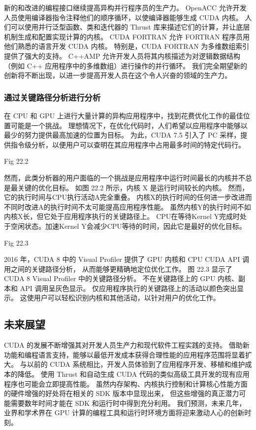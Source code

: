 新的和改进的编程接口继续提高异构并行程序员的生产力。 
OpenACC 允许开发人员使用编译器指令注释他们的顺序循环，以使编译器能够生成 CUDA 内核。 
人们可以使用并行泛型函数、类和迭代器的 Thrust 库来描述它们的计算，并让底层机制生成和配置实现计算的内核。 
CUDA FORTRAN 允许 FORTRAN 程序员用他们熟悉的语言开发 CUDA 内核。 
特别是，CUDA FORTRAN 为多维数组索引提供了强大的支持。 
C++AMP 允许开发人员将其内核描述为对逻辑数据结构（例如 C++ 应用程序中的多维数组）进行操作的并行循环。 
我们完全期望新的创新将不断出现，以进一步提高开发人员在这个令人兴奋的领域的生产力。

\subsubsection{通过关键路径分析进行分析}
在 CPU 和 GPU 上进行大量计算的异构应用程序中，找到花费优化工作的最佳位置可能是一个挑战。 
理想情况下，在优化代码时，人们希望以应用程序中能够以最少的努力提供最高加速的位置为目标。 
为此，CUDA 7.5 引入了 PC 采样，提供指令级分析，以便用户可以查明在其应用程序中占用最多时间的特定代码行。

{\color{red} Fig 22.2}

然而，此类分析器的用户面临的一个挑战是应用程序中运行时间最长的内核并不总是最关键的优化目标。 
如图 22.2 所示，内核 X 是运行时间较长的内核。 然而，它的执行时间与CPU执行活动A完全重叠。
内核X的执行时间的任何进一步改进而不同时改进A的执行时间不太可能提高应用程序性能。 
虽然内核Y的执行时间不如内核X长，但它处于应用程序执行的关键路径上。 
CPU在等待Kernel Y完成时处于空闲状态。加速Kernel Y会减少CPU等待的时间，因此它是最好的优化目标。

{\color{red} Fig 22.3}

2016 年，CUDA 8 中的 Visual Profiler 提供了 GPU 内核和 CPU CUDA API 调用之间的关键路径分析，
从而能够更精确地定位优化工作。 图 22.3 显示了 CUDA 8 Visual Profiler 中的关键路径分析。 
不在关键路径上的 GPU 内核、副本和 API 调用呈灰色显示。 仅应用程序执行的关键路径上的活动以颜色突出显示。 
这使用户可以轻松识别内核和其他活动，以针对用户的优化工作。

\subsection{未来展望}
CUDA 的发展不断增强其对开发人员生产力和现代软件工程实践的支持。 
借助新功能和编程语言支持，能够以最低开发成本获得合理性能的应用程序范围将显着扩大。 
与以前的 CUDA 系统相比，开发人员体验到了应用程序开发、移植和维护成本的降低。 
使用 Thrust 和自动生成 CUDA 代码的类似高级工具开发的现有应用程序也可能会立即提高性能。 
虽然内存架构、内核执行控制和计算核心性能方面的硬件增强的好处将在相关的 SDK 版本中显现出来，
但这些增强的真正潜力可能需要数年时间才能在 SDK 和运行时中得到充分利用。 
我们预测，未来几年，业界和学术界在 GPU 计算的编程工具和运行时环境方面将迎来激动人心的创新时刻。